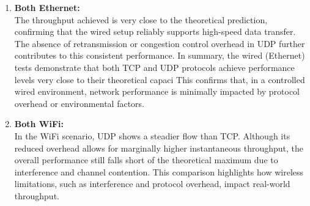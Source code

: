         \begin{enumerate}

            \item \textbf{Both Ethernet:} \\
                The throughput achieved is very close to the theoretical prediction, confirming that the wired setup reliably supports high-speed data transfer.  The absence of retransmission or congestion control overhead in UDP further contributes to this consistent performance. In summary, the wired (Ethernet) tests demonstrate that both TCP and UDP protocols achieve performance levels very close to their theoretical capaci This confirms that, in a controlled wired environment, network performance is minimally impacted by protocol overhead or environmental factors.

            \vspace{0.2cm} %

            \item \textbf{Both WiFi:} \\
                In the WiFi scenario, UDP shows a steadier flow than TCP. Although its reduced overhead allows for marginally higher instantaneous throughput, the overall performance still falls short of the theoretical maximum due to interference and channel contention. This comparison highlights how wireless limitations, such as interference and protocol overhead, impact real-world throughput.


\end{enumerate}
